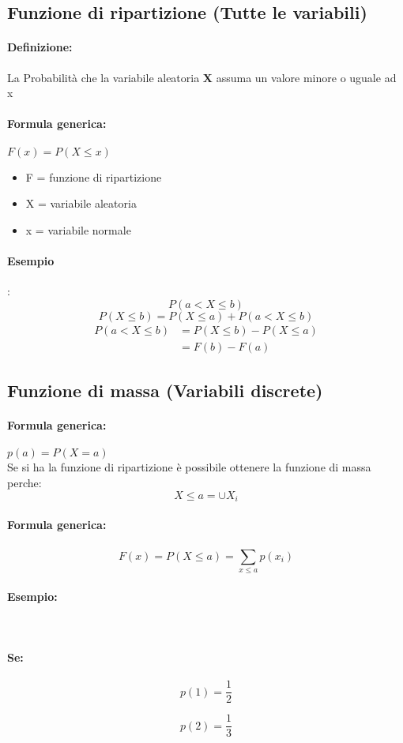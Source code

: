 \documentclass[]{article}
\newcommand{\definizione}{\paragraph{Definizione:}}
\newcommand{\formula}{\paragraph{Formula generica:}}
\begin{document}
    \subsection{Funzione di ripartizione (Tutte le variabili)}
    \definizione
    La Probabilità che la variabile aleatoria \textbf{X} assuma un valore minore o uguale ad x
    \formula $ F(x) = P(X \leq x) $
    \begin{itemize}
        \item F = funzione di ripartizione
        \item X = variabile aleatoria
        \item x = variabile normale
    \end{itemize}
    
    \paragraph{Esempio}:
    \[ P(a < X \leq b) \]
    \[ P(X \leq b) = P(X \leq a) + P(a < X \leq b) \]
    \begin{equation*}
        \begin{split}
            P(a < X \leq b) &= P(X \leq b) - P(X \leq a) \\
            &= F(b) - F(a)
        \end{split}
    \end{equation*}

    \subsection{Funzione di massa (Variabili discrete)}
    \formula $p(a) = P(X = a) $ \\
    Se si ha la funzione di ripartizione è possibile ottenere la funzione di massa perche:
    \[ X \leq a = \cup X_i \]
    \formula \[ F(x) = P(X \leq a) = \sum_{x \leq a}^{} p(x_i) \]
    \paragraph{Esempio:}  \\
    \paragraph{Se:}
    \begin{minipage}{0.45\textwidth}
        \[ p(1) = \frac{1}{2} \]
    \end{minipage}
    \begin{minipage}{0.45\textwidth}
        \[ p(2) = \frac{1}{3} \]
    \end{minipage}
    
\end{document}
